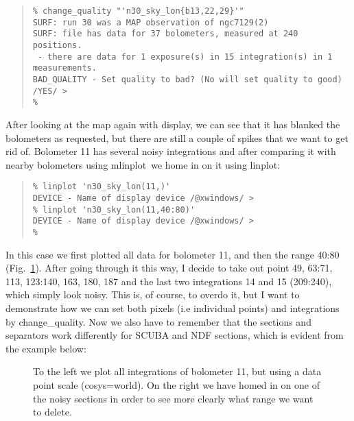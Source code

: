 \documentclass[twoside,11pt]{article}
\newenvironment{myquote}{\begin{quote}\begin{small}}{\end{small}\end{quote}}
\newcommand{\task}[1]{\textsf{#1}}
\newcommand{\chgqual}{\xref{\task{change\_\-qua\-lity}}{sun216}{CHANGE_QUALITY}}
\newcommand{\display}{\xref{\task{display}}{sun95}{DISPLAY}}
\newcommand{\linplot}{\xref{\task{linplot}}{sun95}{LINPLOT}}
\newcommand{\mlinplot}{\xref{\task{mlinplot}}{sun95}{MLINPLOT}}
\newcommand{\xref}[3]{#1}
\begin{document}
\begin{myquote} \begin{verbatim}
% change_quality "'n30_sky_lon{b13,22,29}'"
SURF: run 30 was a MAP observation of ngc7129(2)
SURF: file has data for 37 bolometers, measured at 240 positions.
 - there are data for 1 exposure(s) in 15 integration(s) in 1 measurements.
BAD_QUALITY - Set quality to bad? (No will set quality to good) /YES/ >
%  
\end{verbatim} \end{myquote}

After looking at the map again with \display, we can see that it
has blanked the bolometers as requested, but there are still a couple of
spikes that we want to get rid of. Bolometer 11 has several noisy integrations
and after comparing it with nearby bolometers using \mlinplot\ we home in on
it using \linplot:

\begin{myquote} \begin{verbatim}
% linplot 'n30_sky_lon(11,)'
DEVICE - Name of display device /@xwindows/ > 
% linplot 'n30_sky_lon(11,40:80)'
DEVICE - Name of display device /@xwindows/ >
%  
\end{verbatim} \end{myquote}


In this case we first plotted all data for bolometer 11, and then the range
40:80 (Fig.\ \ref{fig:bolo11}). After going through it this way, I decide to take
out point 49, 63:71, 113, 123:140, 163, 180, 187 and the last two integrations
14 and 15 (209:240), which simply look noisy. This is, of course, to overdo it,
but I want to demonstrate how we can set both pixels (i.e individual points)
and integrations by \chgqual. Now we also have to remember that the sections
and separators work differently for SCUBA and NDF sections, which is evident
from the example below:

\begin{figure}
\begin{center}
\caption{To the left we plot all integrations of bolometer 11, but using a
data point scale (cosys=world). On the right we have homed in on one of the
noisy sections in order to see more clearly what range we want to delete.
}
\label{fig:bolo11}
\end{center}
\end{figure}
\end{document}
